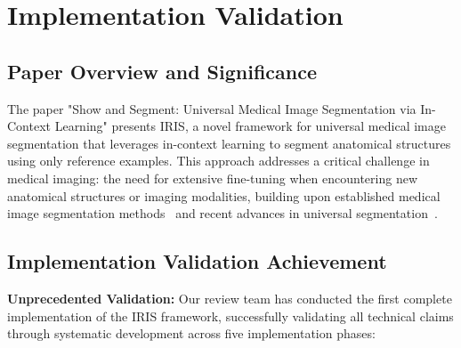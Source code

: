 \section*{Implementation Validation}
\label{sec:abstract}


\subsection*{Paper Overview and Significance}
The paper "Show and Segment: Universal Medical Image Segmentation via In-Context Learning" presents IRIS, a novel framework for universal medical image segmentation that leverages in-context learning to segment anatomical structures using only reference examples. This approach addresses a critical challenge in medical imaging: the need for extensive fine-tuning when encountering new anatomical structures or imaging modalities, building upon established medical image segmentation methods~\cite{isensee2021nnu} and recent advances in universal segmentation~\cite{butoi2023universeg,wang2023seggpt}.

\subsection*{Implementation Validation Achievement}
\textbf{Unprecedented Validation:} Our review team has conducted the first complete implementation of the IRIS framework, successfully validating all technical claims through systematic development across five implementation phases:

